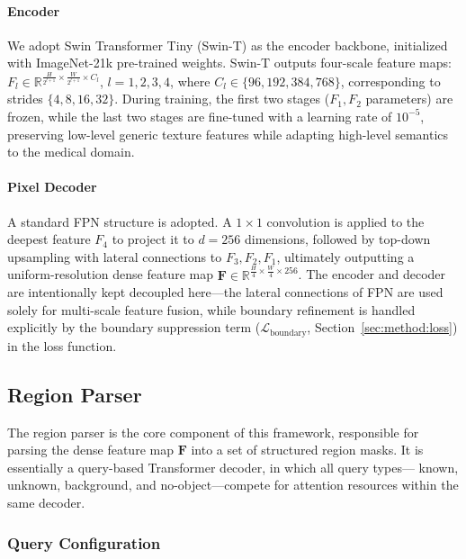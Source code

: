 \documentclass[3p,twocolumn,authoryear]{elsarticle}
\newcommand{\R}{\mathbb{R}}                              %
\newcommand{\bF}{\mathbf{F}}                              %
\begin{document}
\paragraph{Encoder}
We adopt Swin Transformer Tiny (Swin-T) as the encoder backbone,
initialized with ImageNet-21k pre-trained weights.
Swin-T outputs four-scale feature maps:
$F_l \in \R^{\frac{H}{2^{l+1}} \times \frac{W}{2^{l+1}} \times C_l}$, $l=1,2,3,4$,
where $C_l \in \{96, 192, 384, 768\}$, corresponding to strides $\{4, 8, 16, 32\}$.
During training, the first two stages ($F_1, F_2$ parameters) are frozen,
while the last two stages are fine-tuned with a learning rate of $10^{-5}$,
preserving low-level generic texture features while adapting high-level semantics
to the medical domain.

\paragraph{Pixel Decoder}
A standard FPN structure is adopted.
A $1 \times 1$ convolution is applied to the deepest feature $F_4$ to project it
to $d=256$ dimensions, followed by top-down upsampling with lateral connections
to $F_3, F_2, F_1$, ultimately outputting a uniform-resolution dense feature map
$\bF \in \R^{\frac{H}{4} \times \frac{W}{4} \times 256}$.
The encoder and decoder are intentionally kept decoupled here---the lateral connections
of FPN are used solely for multi-scale feature fusion, while boundary refinement is
handled explicitly by the boundary suppression term ($\mathcal{L}_{\text{boundary}}$,
Section~\ref{sec:method:loss}) in the loss function.

\subsection{Region Parser}\label{sec:method:parser}

The region parser is the core component of this framework, responsible for parsing
the dense feature map $\bF$ into a set of structured region masks.
It is essentially a query-based Transformer decoder, in which all query types---
known, unknown, background, and no-object---compete for attention resources within
the same decoder.

\subsubsection{Query Configuration}\label{sec:method:parser:query}
\end{document}
